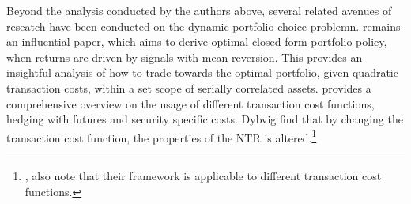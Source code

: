 \documentclass[11pt]{article}
\begin{document}
Beyond the analysis conducted by the authors above, several related avenues of reseatch have been conducted on the dynamic portfolio choice problemn.
\textcite{Garleanu2013} remains an influential paper, which aims to derive optimal closed form portfolio policy, when returns are driven by signals with mean reversion.
This provides an insightful analysis of how to trade towards the optimal portfolio, given quadratic transaction costs, within a set scope of serially correlated assets.
\textcite{Dybvig2020} provides a comprehensive overview on the usage of different transaction cost functions, hedging with futures and security specific costs.
Dybvig find that by changing the transaction cost function, the properties of the NTR is altered.\footnote{\textcite{Scheidegger2023}, also note that their framework is applicable to different transaction cost functions.}


\ifdefined\COMPILINGMAIN
\else
\printbibliography
\end{document}
